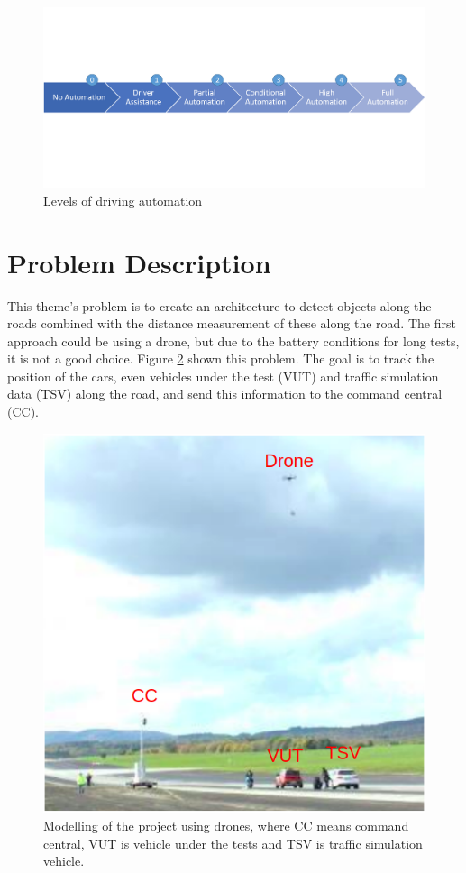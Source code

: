 \begin{figure}[H]
\centering
\includegraphics[scale=0.55]{imagens/diagrama_levels.png}
\caption{Levels of driving automation}
\label{fig:automation}
\end{figure}

\section{Problem Description}

This theme's problem is to create an architecture to detect objects along the roads combined with the distance measurement of these along the road. The first approach could be using a drone, but due to the battery conditions for long tests, it is not a good choice. Figure \ref{fig:tests} shown this problem. The goal is to track the position of the cars, even vehicles under the test (VUT) and traffic simulation data (TSV) along the road, and send this information to the command central (CC). 

\begin{figure}[H]
\centering
\includegraphics[scale=0.6]{imagens/proposal.png}
\caption{Modelling of the project using drones, where CC means command central, VUT is vehicle under the tests and TSV is traffic simulation vehicle.}
\label{fig:tests}
\end{figure}

